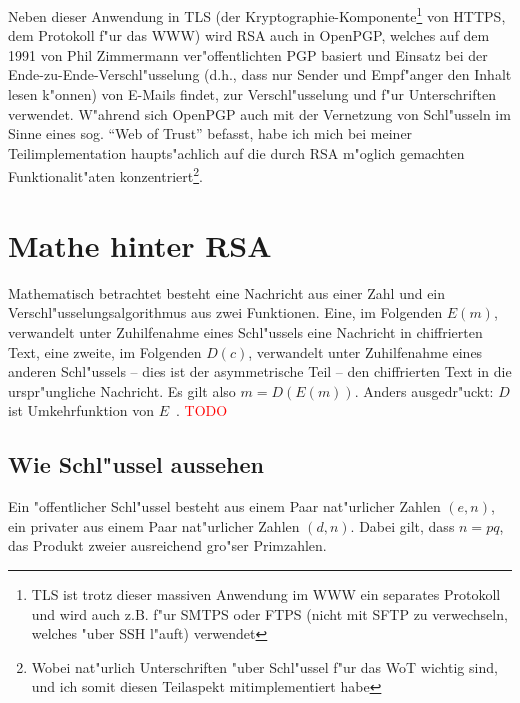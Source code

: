\documentclass[12pt]{article}
\newcommand{\todo}[1]{\textcolor{red}{\mbox{TODO}}\marginpar{\textcolor{red}{#1}}}
\begin{document}
Neben dieser Anwendung in TLS (der Kryptographie-Komponente\footnote{
TLS ist trotz dieser massiven Anwendung im WWW ein separates Protokoll und wird auch z.B. f"ur SMTPS oder FTPS (nicht mit SFTP zu verwechseln, welches "uber SSH l"auft) verwendet}
von HTTPS, dem Protokoll f"ur das WWW) wird RSA auch in OpenPGP,
welches auf dem 1991 von Phil Zimmermann ver"offentlichten PGP basiert und Einsatz bei der Ende-zu-Ende-Verschl"usselung
(d.h., dass nur Sender und Empf"anger den Inhalt lesen k"on\-nen)
von E-Mails findet, zur Verschl"usselung und f"ur Unterschriften verwendet.
W"ah\-rend sich OpenPGP auch mit der Vernetzung von Schl"usseln im Sinne eines sog. "`Web of Trust"' befasst,
habe ich mich bei meiner Teilimplementation haupts"achlich auf die durch RSA m"oglich gemachten
Funktionalit"aten konzentriert\footnote{Wobei nat"urlich Unterschriften "uber Schl"ussel f"ur das WoT wichtig sind, und ich somit diesen Teilaspekt mitimplementiert habe}.

\section{Mathe hinter RSA}

Mathematisch betrachtet besteht eine Nachricht aus einer Zahl und ein
Ver\-schl"us\-sel\-ungs\-al\-go\-rith\-mus aus zwei Funktionen.
Eine, im Folgenden $E(m)$, verwandelt unter Zuhilfenahme eines Schl"ussels eine
Nachricht in chiffrierten Text, eine zweite, im Folgenden $D(c)$,
verwandelt unter Zuhilfenahme eines anderen Schl"ussels -- dies ist der asymmetrische Teil --
den chiffrierten Text in die urspr"ungliche Nachricht.
Es gilt also $m = D(E(m))$.
Anders ausgedr"uckt: $D$ ist Umkehrfunktion von $E$~\cite{rsa}.
\todo{Hier irgendwo auch Unterschriften erw"ahnen?}

\subsection{Wie Schl"ussel aussehen}
\label{subsec:rsa:keys}

Ein "offentlicher Schl"ussel besteht aus einem Paar nat"urlicher Zahlen $(e, n)$,
ein privater aus einem Paar nat"urlicher Zahlen $(d, n)$.
Dabei gilt, dass $n = pq$, das Produkt zweier ausreichend gro"ser Primzahlen.~\cite{rsa}
\end{document}
